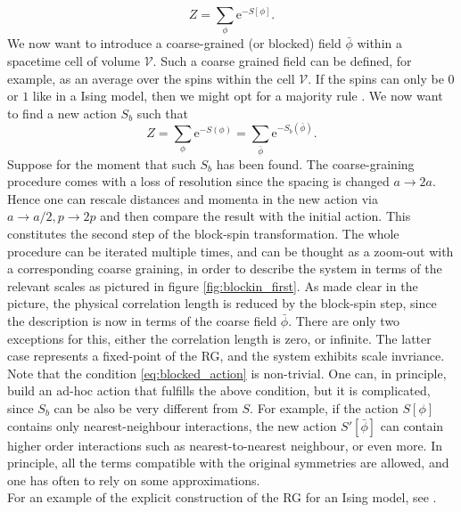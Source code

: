 \begin{equation*}
    Z=\sum_{\phi} \mathrm{e}^{-S[\phi]}.
\end{equation*}
We now want to introduce a coarse-grained (or blocked) field $\bar\phi$ within a spacetime cell of volume $\mathcal{V}$. Such a coarse grained field can be defined, for example, as an average over the spins within the cell $\mathcal{V}$. If the spins can only be $0$ or $1$ like in a Ising model, then we might opt for a majority rule \cite{cardy_1996}.
We now want to find a new action $S_b$ such that 
\begin{equation}
    Z=\sum_{\phi} \mathrm{e}^{-S(\phi)}= \sum_{\bar\phi} \mathrm{e}^{-S_b\left(\bar\phi\right)}.
    \label{eq:blocked_action}
\end{equation}
Suppose for the moment that such $S_b$ has been found. The coarse-graining procedure comes with a loss of resolution since the spacing is changed $a \to 2a$. Hence one can rescale distances and momenta in the new action via $a \to a/2, p \to 2p$ and then compare the result with the initial action. This constitutes the second step of the block-spin transformation. The whole procedure can be iterated multiple times, and can be thought as a zoom-out with a corresponding coarse graining, in order to describe the system in terms of the relevant scales as pictured in figure \ref{fig:blockin_first}. As made clear in the picture, the physical correlation length is reduced by the block-spin step, since the description is now in terms of the coarse field $\bar\phi$. 
There are only two exceptions for this, either the correlation length is zero, or infinite. The latter case represents a fixed-point of the RG, and the system exhibits scale invriance. \\
Note that the condition \eqref{eq:blocked_action} is non-trivial. One can, in principle, build an ad-hoc action that fulfills the above condition, but it is complicated, since $S_b$ can be also be very different from $S$. For example, if the action $S[\phi]$ contains only nearest-neighbour interactions, the new action $S'[\bar\phi]$ can contain higher order interactions such as nearest-to-nearest neighbour, or even more.  In principle, all the terms compatible with the original symmetries are allowed, and one has often to rely on some approximations. \\
For an example of the explicit construction of the RG for an Ising model, see \cite{cardy_1996}.

